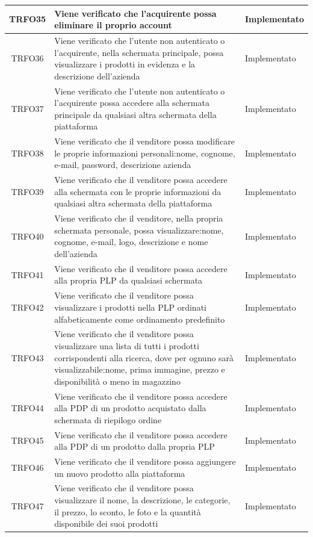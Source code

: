\begin{longtable}{|c| C{10cm} |C{3cm}|}
	TRFO35 & Viene verificato che l'acquirente possa eliminare il proprio account & Implementato\\ \hline
	TRFO36 & Viene verificato che l'utente non autenticato o l'acquirente, nella schermata principale, possa visualizzare i prodotti in evidenza e la descrizione dell'azienda & Implementato\\ \hline
	TRFO37 & Viene verificato che l'utente non autenticato o l'acquirente possa accedere alla schermata principale da qualsiasi altra schermata della piattaforma & Implementato\\ \hline
    TRFO38 & Viene verificato che il venditore possa modificare le proprie informazioni personali:nome, cognome, e-mail, password, descrizione azienda & Implementato\\ \hline
	TRFO39 & Viene verificato che il venditore possa accedere alla schermata con le proprie informazioni da qualsiasi altra schermata della piattaforma & Implementato\\ \hline
    TRFO40 & Viene verificato che il venditore, nella propria schermata personale, possa visualizzare:nome, cognome, e-mail, logo, descrizione e nome dell'azienda & Implementato\\ \hline
	TRFO41 & Viene verificato che il venditore possa accedere alla propria PLP da qualsiasi schermata & Implementato\\ \hline
	TRFO42 & Viene verificato che il venditore possa visualizzare i prodotti nella PLP ordinati alfabeticamente come ordinamento predefinito & Implementato\\ \hline
	TRFO43 & Viene verificato che il venditore possa visualizzare una lista di tutti i prodotti corrispondenti alla ricerca, dove per ognuno sarà visualizzabile:nome, prima immagine, prezzo e disponibilità o meno in magazzino & Implementato\\ \hline
	TRFO44 & Viene verificato che il venditore possa accedere alla PDP di un prodotto acquistato dalla schermata di riepilogo ordine & Implementato\\ \hline
	TRFO45 & Viene verificato che il venditore possa accedere alla PDP di un prodotto dalla propria PLP & Implementato\\ \hline
    	TRFO46 & Viene verificato che il venditore possa aggiungere un nuovo prodotto alla piattaforma & Implementato\\ \hline
    	TRFO47 & Viene verificato che il venditore possa visualizzare il nome, la descrizione, le categorie, il prezzo, lo sconto, le foto e la quantità disponibile dei suoi prodotti & Implementato\\ \hline

\end{longtable}
